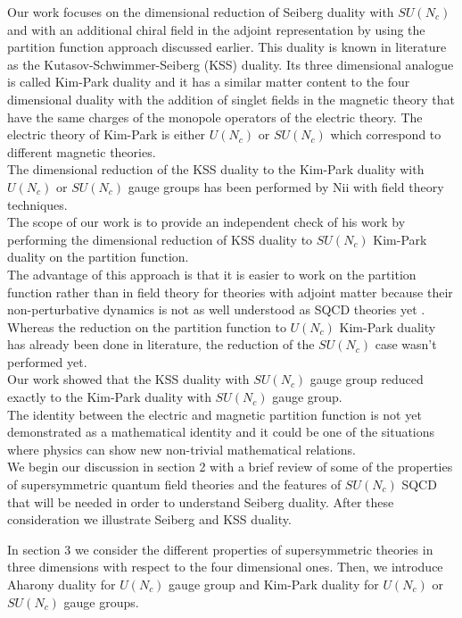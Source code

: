 Our work focuses on the dimensional reduction of Seiberg duality with $SU(N_c)$ and with an additional chiral field in the adjoint representation by using the partition function approach discussed earlier.
This duality is known in literature as the Kutasov-Schwimmer-Seiberg (KSS) duality.
Its three dimensional analogue is called Kim-Park duality and it has a similar matter content to the four dimensional duality with the addition of singlet fields in the magnetic theory that have the same charges of the monopole operators of the electric theory.
The electric theory of Kim-Park is either $U(N_c)$ or $SU(N_c)$ which correspond to different magnetic theories. 
 \\
The dimensional reduction of the KSS duality to the Kim-Park duality with $U(N_c)$ or $SU(N_c)$ gauge groups has been performed by Nii with field theory techniques.\\
The scope of our work is to provide an independent check of his work by performing the dimensional reduction of KSS duality to $SU(N_c)$ Kim-Park duality on the partition function.\\
The advantage of this approach is that it is easier to work on the partition function rather than in field theory for theories with adjoint matter because their non-perturbative dynamics is not as well understood as SQCD theories yet .
Whereas the reduction on the partition function to $U(N_c)$ Kim-Park duality has already been done in literature, the reduction of the $SU(N_c)$ case wasn't performed yet.\\
Our work showed that the KSS duality with $SU(N_c)$ gauge group reduced exactly to the Kim-Park duality with $SU(N_c)$ gauge group.\\
The identity between the electric and magnetic partition function is not yet demonstrated as a mathematical identity and it could be one of the situations where physics can show new non-trivial mathematical relations. 
\\

We begin our discussion in section 2 with a brief review of some of the properties of supersymmetric quantum field theories and the features of $SU(N_c)$ SQCD that will be needed in order to understand Seiberg duality.
After these consideration we illustrate Seiberg and KSS duality.

In section 3 we consider the different properties of supersymmetric theories in three dimensions with respect to the four dimensional ones.
Then, we introduce Aharony duality for $U(N_c)$ gauge group and Kim-Park duality for $U(N_c)$ or $SU(N_c)$ gauge groups.

